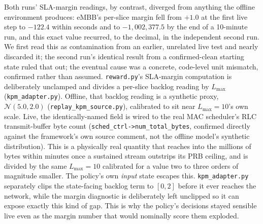 \documentclass[journal]{IEEEtran}
\begin{document}
Both runs' SLA-margin readings, by contrast, diverged from anything the
offline environment produces: eMBB's per-slice margin fell from
$+1.0$ at the first live step to $-122.4$ within seconds and to
$-1{,}002{,}377.5$ by the end of a 10-minute run, and this exact
value recurred, to the decimal, in the independent second run. We
first read this as contamination from an earlier, unrelated live test
and nearly discarded it; the second run's identical result from a
confirmed-clean starting state ruled that out; the eventual cause was
a concrete, code-level unit mismatch, confirmed rather than assumed.
\texttt{reward.py}'s SLA-margin computation is deliberately unclamped
and divides a per-slice backlog reading by $L_{\max}$
(\texttt{kpm\_adapter.py}). Offline, that backlog reading is a
synthetic proxy, $\mathcal{N}(5.0, 2.0)$
(\texttt{replay\_kpm\_source.py}), calibrated to sit near
$L_{\max}=10$'s own scale. Live, the identically-named field is wired
to the real MAC scheduler's RLC transmit-buffer byte count
(\texttt{sched\_ctrl->num\_total\_bytes}, confirmed directly against
the framework's own source comment, not the offline model's synthetic
distribution). This is a physically real quantity that reaches into the
millions of bytes within minutes once a sustained stream outstrips its
PRB ceiling, and is divided by the same $L_{\max}=10$ calibrated for a
value two to three orders of magnitude smaller. The policy's own
\emph{input} state escapes this. \texttt{kpm\_adapter.py} separately
clips the state-facing backlog term to $[0,2]$ before it ever reaches
the network, while the margin diagnostic is deliberately left unclipped
so it can expose exactly this kind of gap. This is why the
policy's decisions stayed sensible live even as the margin number that
would nominally score them exploded.
\end{document}

